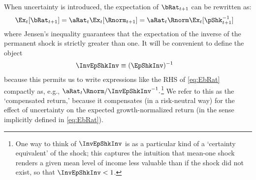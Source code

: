 \documentclass[./BufferStockTheory.tex]{subfiles}
\begin{document}
When uncertainty is introduced, the expectation of $\bRat_{t+1}$ can be rewritten as:  
\begin{equation}\begin{gathered}\begin{aligned}
  \Ex_{t}[\bRat_{t+1}]  & =  \aRat_{t}\Ex_{t}[\Rnorm_{t+1}] = \aRat_{t}\Rnorm\Ex_{t}[\pShk_{t+1}^{-1}] \label{eq:EbRat}
\end{aligned}\end{gathered}\end{equation}
where Jensen's inequality guarantees that the expectation of the inverse of the permanent
shock is strictly greater than one.  It will be convenient to define the object \hypertarget{InvEpShkInv}{}
\begin{align*}
  \InvEpShkInv  & \equiv  (\EpShkInv)^{-1}
\end{align*}
because this permits us to write expressions like the RHS of
\eqref{eq:EbRat} compactly as, e.g., $\aRat_{t}\Rnorm/
\InvEpShkInv^{-1}.$\footnote{One way to think of $\InvEpShkInv$ is as
  a particular kind of a `certainty equivalent' of the shock; this
  captures the intuition that mean-one shock renders a given mean
  level of income less valuable than if the shock did not exist, so
  that $\InvEpShkInv < 1$.}  We refer to this as the `compensated return,' because it compensates (in a risk-neutral way) for the effect of
uncertainty on the expected growth-normalized return (in the sense implicitly defined in
\eqref{eq:EbRat}).
\end{document}
